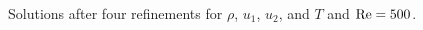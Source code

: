 \begin{figure}[!h]
\caption{Solutions after four refinements for $\rho$, $u_1$, $u_2$, and $T$ and $\Reyn = 500$.}
\label{fig:Re500}
\end{figure}

